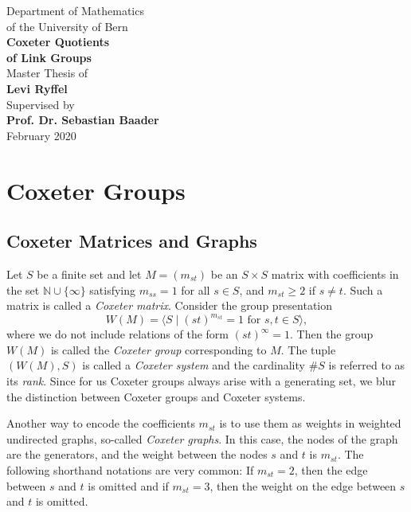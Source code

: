 \documentclass{article}
\theoremstyle{definition}
\begin{document}
\begin{titlepage}
\begin{center}
\Large{Department of Mathematics \\ of the University of Bern}\\
\vspace*{3.5cm}
\Huge{\textbf{Coxeter Quotients \\ of Link Groups}}\\
\vspace*{6.5cm}
\Large{Master Thesis of} \\ \Large{\textbf{Levi Ryffel}}\\
\vspace*{.25cm}
Supervised by \\ \textbf{Prof. Dr. Sebastian Baader}\\
\vspace*{2cm}
February 2020
\end{center}
\end{titlepage}

\tableofcontents
\newpage

\section{Coxeter Groups}
\subsection{Coxeter Matrices and Graphs}
Let $S$ be a finite set and let $M = (m_{st})$ be an $S \times S$ matrix with coefficients in the set $\mathbb{N} \cup \{\infty\}$ satisfying $m_{ss} = 1$ for all $s \in S$, and $m_{st} \geq 2$ if $s \ne t$. Such a matrix is called a \textit{Coxeter matrix}. Consider the group presentation
$$W(M) = \langle S \; | \; (st)^{m_{st}} = 1 \text{ for } s,t\in S \rangle,$$
where we do not include relations of the form $(st)^\infty = 1$.
Then the group $W(M)$ is called the \textit{Coxeter group} corresponding to $M$. The tuple $(W(M),S)$ is called a \textit{Coxeter system} and the cardinality $\#S$ is referred to as its \textit{rank}. Since for us Coxeter groups always arise with a generating set, we blur the distinction between Coxeter groups and Coxeter systems.

Another way to encode the coefficients $m_{st}$ is to use them as weights in weighted undirected graphs, so-called \textit{Coxeter graphs}. In this case, the nodes of the graph are the generators, and the weight between the nodes $s$ and $t$ is $m_{st}$. The following shorthand notations are very common: If $m_{st} = 2$, then the edge between $s$ and $t$ is omitted and if $m_{st} = 3$, then the weight on the edge between $s$ and $t$ is omitted.
\end{document}
